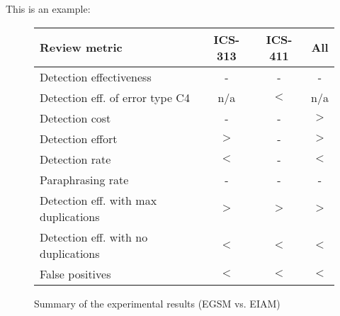 This is an example:


\begin{figure}[htpb]
 \caption{Summary of the experimental results (EGSM vs. EIAM)}
  \begin{center}
  \begin{tabular}{|l|c|c|c|}
   \hline
    Review metric         & ICS-313 & ICS-411 & All \\
   \hline
   Detection effectiveness & -       & -       & - \\
   Detection eff. of error type C4   & n/a     & $<$     & n/a \\   
   Detection cost          & -       & -       & $>$ \\  
   Detection effort        & $>$     & -       & $>$ \\
   Detection rate          & $<$     & -       & $<$ \\
   Paraphrasing rate       &  -      & -       & - \\
   Detection eff. with max duplications & $>$   & $>$     & $>$ \\
   Detection eff. with no duplications & $<$    & $<$     & $<$ \\
   False positives         & $<$     & $<$     & $<$ \\
  \hline
   \end{tabular}
  \end{center}
 \label{summary}
\end{figure}

